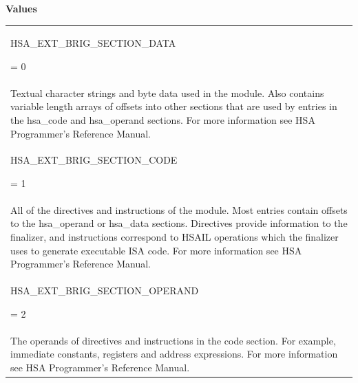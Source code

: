 \documentclass[final]{book}
\newcommand{\reftyp}[1]{#1}
\newcommand{\refenu}[1]{\reftyp{#1}}
\begin{document}
\noindent\textbf{Values}\\[-5mm]
\begin{longtable}{@{\hspace{2em}}p{\linewidth-2em}}
\hspace{-2em}\hypertarget{group__finalizer_1gga3060576486841364f0842a76810aea06a9b040e9aae3efa23134666d054a3a839}{\refenu{HSA_\-EXT_\-BRIG_\-SECTION_\-DATA}} = 0\\Textual character strings and byte data used in the module. Also contains variable length arrays of offsets into other sections that are used by entries in the hsa_\-code and hsa_\-operand sections. For more information see HSA Programmer's Reference Manual.\\[2mm]
\hspace{-2em}\hypertarget{group__finalizer_1gga3060576486841364f0842a76810aea06a43997c8d8ab6c03c301c949bdb1819c7}{\refenu{HSA_\-EXT_\-BRIG_\-SECTION_\-CODE}} = 1\\All of the directives and instructions of the module. Most entries contain offsets to the hsa_\-operand or hsa_\-data sections. Directives provide information to the finalizer, and instructions correspond to HSAIL operations which the finalizer uses to generate executable ISA code. For more information see HSA Programmer's Reference Manual.\\[2mm]
\hspace{-2em}\hypertarget{group__finalizer_1gga3060576486841364f0842a76810aea06ae52428f823f64d4ad9a0d8e2e29aea0b}{\refenu{HSA_\-EXT_\-BRIG_\-SECTION_\-OPERAND}} = 2\\The operands of directives and instructions in the code section. For example, immediate constants, registers and address expressions. For more information see HSA Programmer's Reference Manual.
\end{longtable}
\end{document}
